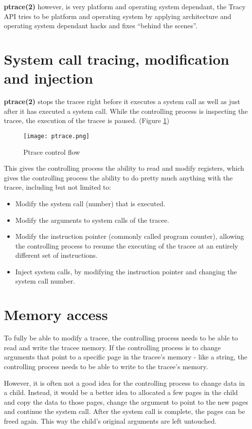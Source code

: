 \documentclass[a4paper, twoside, 10pt, twocolumn]{report}
\begin{document}
\textbf{ptrace(2)} however, is very platform and operating system dependant,
the Tracy API tries to be platform and operating system by applying architecture
and operating system dependant hacks and fixes ``behind the scenes''.

\section{System call tracing, modification and injection}

\textbf{ptrace(2)} stops the tracee right before it executes a system call as
well as just after it has executed a system call.
While the controlling process is inspecting the tracee, the execution of the
tracee is paused. (Figure \ref{fig1})


\begin{figure}
\label{fig1}
\texttt{[image: ptrace.png]}
\caption{Ptrace control flow}
\end{figure}

This gives the controlling process the ability to read and modify registers,
which gives the controlling process the ability to do pretty much anything
with the tracee, including but not limited to:

\begin{itemize}
\item Modify the system call (number) that is executed.
\item Modify the arguments to system calls of the tracee.
\item Modify the instruction pointer (commonly called program counter), allowing
    the controlling process to resume the executing of the tracee at an entirely
    different set of instructions.
\item Inject system calls, by modifying the instruction pointer and changing the
    system call number.
\end{itemize}

\section{Memory access}

To fully be able to modify a tracee, the controlling process needs to be able to
read and write the tracee memory. If the controlling process is to change
arguments that point to a specific page in the tracee's memory - like a string,
the controlling process needs to be able to write to the tracee's memory.

However, it is often not a good idea for the controlling process to change data
in a child. Instead, it would be a better idea to allocated a few pages in the
child and copy the data to those pages, change the argument to point to the new
pages and continue the system call. After the system call is complete, the pages
can be freed again. This way the child's original arguments are left untouched.
\end{document}
